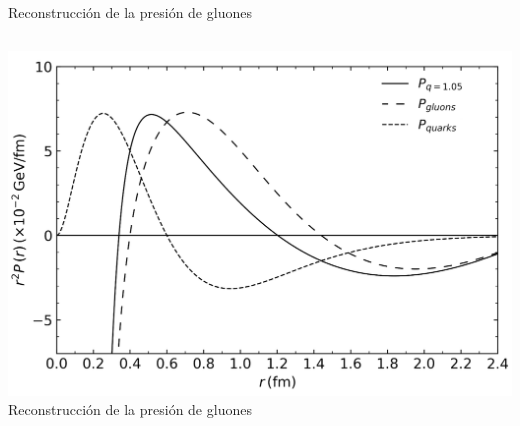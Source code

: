 \documentclass{beamer}
\begin{document}
\begin{frame}{Reconstrucción de la presión de gluones}
  \begin{columns}
    \centering
    \includegraphics[width=\linewidth]{figures/Pressure_gluons_reconstructed.png}
    \vspace{0.3em}
    \scriptsize \color{black} Reconstrucción de la presión de gluones


\end{columns}
\end{frame}
\end{document}
